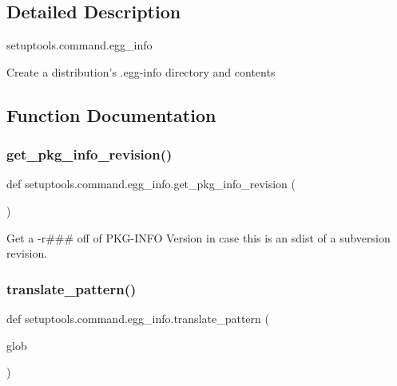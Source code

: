 \subsection{Detailed Description}
\begin{DoxyVerb}setuptools.command.egg_info

Create a distribution's .egg-info directory and contents\end{DoxyVerb}
 

\subsection{Function Documentation}
\mbox{\label{namespacesetuptools_1_1command_1_1egg__info_ac6d4da2fc87ba11bb3042e35ae77c7ed}} 
\subsubsection{\texorpdfstring{get\+\_\+pkg\+\_\+info\+\_\+revision()}{get\_pkg\_info\_revision()}}
{\footnotesize\ttfamily def setuptools.\+command.\+egg\+\_\+info.\+get\+\_\+pkg\+\_\+info\+\_\+revision (\begin{DoxyParamCaption}{ }\end{DoxyParamCaption})}

\begin{DoxyVerb}Get a -r### off of PKG-INFO Version in case this is an sdist of
a subversion revision.
\end{DoxyVerb}
 \mbox{\label{namespacesetuptools_1_1command_1_1egg__info_aa144258099051fcc4002b9750d064587}} 
\subsubsection{\texorpdfstring{translate\+\_\+pattern()}{translate\_pattern()}}
{\footnotesize\ttfamily def setuptools.\+command.\+egg\+\_\+info.\+translate\+\_\+pattern (\begin{DoxyParamCaption}\item[{}]{glob }\end{DoxyParamCaption})}

